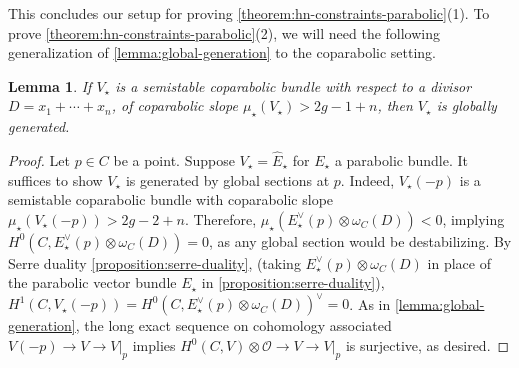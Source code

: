 \documentclass[12 pt]{amsart}
\theoremstyle{plain}
\newtheorem{lemma}[subsubsection]{Lemma}
\theoremstyle{definition}
\theoremstyle{remark}
\numberwithin{equation}{section}
\begin{document}
This concludes our setup for proving
\autoref{theorem:hn-constraints-parabolic}(1).
To prove 
\autoref{theorem:hn-constraints-parabolic}(2), we will need the following
generalization of \autoref{lemma:global-generation} to the coparabolic setting.
\begin{lemma}
	\label{lemma:coparabolic-global-generation}
	If $V_\star$ is a semistable coparabolic bundle with respect to a
	divisor $D = x_1 + \cdots + x_n$, of coparabolic slope
	$\mu_\star(V_\star) > 2g - 1 + n$, then $V_\star$ is globally
	generated.
\end{lemma}
\begin{proof}
	Let $p\in C$ be a point. 
	Suppose $V_\star = \widehat{E}_\star$ for $E_\star$ a parabolic bundle.	
	It suffices to show $V_\star$ is generated
	by global sections at $p$. Indeed,
	$V_\star(-p)$ is a semistable coparabolic bundle with coparabolic slope
	$\mu_\star(V_\star(-p)) > 2g-2+n$. 
	Therefore, $\mu_\star(E_\star^\vee(p) \otimes \omega_C(D)) < 0$,
	implying $H^0(C, E_\star^\vee(p) \otimes \omega_C(D)) = 0$,
	as any global section would be destabilizing.
	By Serre duality \autoref{proposition:serre-duality}, (taking
		$E_\star^\vee(p) \otimes \omega_C(D)$ in place of the parabolic
	vector bundle $E_\star$ in \autoref{proposition:serre-duality}),
	$H^1(C, V_\star(-p)) = H^0(C, E_\star^\vee(p) \otimes \omega_C(D))^\vee = 0$.
	As in \autoref{lemma:global-generation},
	the long exact sequence on cohomology associated $V(-p) \to V \to V|_p$
	implies $H^0(C, V) \otimes \mathscr O \to V \to V|_p$ is surjective, as
	desired.
\end{proof}
\end{document}
